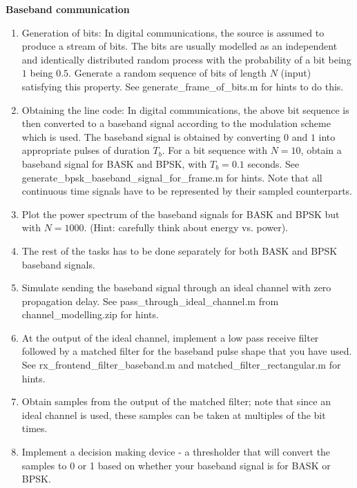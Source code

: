 \textbf{Baseband communication}
\begin{enumerate}
\item Generation of bits: In digital communications, the source is assumed to produce a stream of bits. The bits are usually modelled as an independent and identically distributed random process with the probability of a bit being $1$ being $0.5$. Generate a random sequence of bits of length $N$ (input) satisfying this property. See generate\_frame\_of\_bits.m for hints to do this.
\item Obtaining the line code: In digital communications, the above bit sequence is then converted to a baseband signal according to the modulation scheme which is used. The baseband signal is obtained by converting $0$ and $1$ into appropriate pulses of duration $T_{b}$. For a bit sequence with $N = 10$, obtain a baseband signal for BASK and BPSK, with $T_{b} = 0.1$ seconds. See generate\_bpsk\_baseband\_signal\_for\_frame.m for hints. Note that all continuous time signals have to be represented by their sampled counterparts.
\item Plot the power spectrum of the baseband signals for BASK and BPSK but with $N =  1000$. (Hint: carefully think about energy vs. power).
\item The rest of the tasks has to be done separately for both BASK and BPSK baseband signals.
\item Simulate sending the baseband signal through an ideal channel with zero propagation delay. See pass\_through\_ideal\_channel.m from channel\_modelling.zip for hints.
\item At the output of the ideal channel, implement a low pass receive filter followed by a matched filter for the baseband pulse shape that you have used. See rx\_frontend\_filter\_baseband.m and matched\_filter\_rectangular.m for hints.
\item Obtain samples from the output of the matched filter; note that since an ideal channel is used, these samples can be taken at multiples of the bit times.
\item Implement a decision making device - a thresholder that will convert the samples to 0 or 1 based on whether your baseband signal is for BASK or BPSK.
\end{enumerate}

